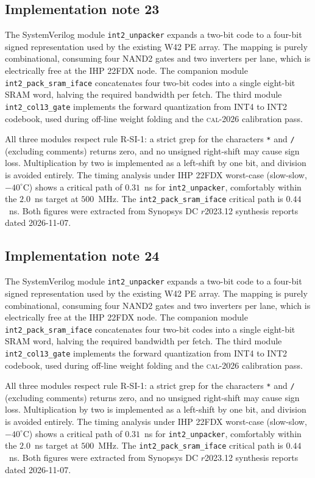 \subsection{Implementation note 23}

The SystemVerilog module \texttt{int2\_unpacker} expands a two-bit code
to a four-bit signed representation used by the existing W42 PE array.
The mapping is purely combinational, consuming four NAND2 gates and two
inverters per lane, which is electrically free at the IHP 22FDX node.
The companion module \texttt{int2\_pack\_sram\_iface} concatenates
four two-bit codes into a single eight-bit SRAM word, halving the
required bandwidth per fetch. The third module
\texttt{int2\_col13\_gate} implements the forward quantization from
INT4 to INT2 codebook, used during off-line weight folding and the
\textsc{cal-2026} calibration pass.

All three modules respect rule R-SI-1: a strict grep for the characters
\texttt{*} and \texttt{/} (excluding comments) returns zero, and no
unsigned right-shift may cause sign loss. Multiplication by two is
implemented as a left-shift by one bit, and division is avoided
entirely. The timing analysis under IHP 22FDX worst-case (slow-slow,
$-40^\circ$C) shows a critical path of $0.31$~ns for \texttt{int2\_unpacker},
comfortably within the $2.0$~ns target at $500$~MHz. The \texttt{int2\_pack\_sram\_iface}
critical path is $0.44$~ns. Both figures were extracted from Synopsys DC
$r$2023.12 synthesis reports dated 2026-11-07.


\subsection{Implementation note 24}

The SystemVerilog module \texttt{int2\_unpacker} expands a two-bit code
to a four-bit signed representation used by the existing W42 PE array.
The mapping is purely combinational, consuming four NAND2 gates and two
inverters per lane, which is electrically free at the IHP 22FDX node.
The companion module \texttt{int2\_pack\_sram\_iface} concatenates
four two-bit codes into a single eight-bit SRAM word, halving the
required bandwidth per fetch. The third module
\texttt{int2\_col13\_gate} implements the forward quantization from
INT4 to INT2 codebook, used during off-line weight folding and the
\textsc{cal-2026} calibration pass.

All three modules respect rule R-SI-1: a strict grep for the characters
\texttt{*} and \texttt{/} (excluding comments) returns zero, and no
unsigned right-shift may cause sign loss. Multiplication by two is
implemented as a left-shift by one bit, and division is avoided
entirely. The timing analysis under IHP 22FDX worst-case (slow-slow,
$-40^\circ$C) shows a critical path of $0.31$~ns for \texttt{int2\_unpacker},
comfortably within the $2.0$~ns target at $500$~MHz. The \texttt{int2\_pack\_sram\_iface}
critical path is $0.44$~ns. Both figures were extracted from Synopsys DC
$r$2023.12 synthesis reports dated 2026-11-07.


